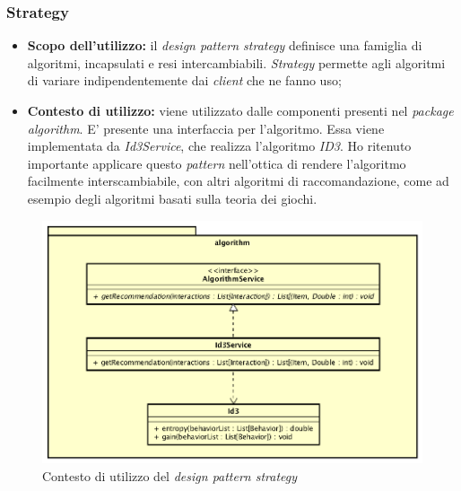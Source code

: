 \subsubsection{Strategy}
\begin{itemize}
\item\textbf{Scopo dell'utilizzo:} il \emph{design pattern strategy} definisce una famiglia di algoritmi, incapsulati e resi intercambiabili. \emph{Strategy} permette agli algoritmi di variare indipendentemente dai \emph{client} che ne fanno uso;
\item \textbf{Contesto di utilizzo:} viene utilizzato dalle componenti presenti nel \emph{package algorithm}. E' presente una interfaccia per l'algoritmo. Essa viene implementata da \emph{Id3Service}, che realizza l'algoritmo \emph{ID3}. Ho ritenuto importante applicare questo \emph{pattern} nell'ottica di rendere l'algoritmo facilmente interscambiabile, con altri algoritmi di raccomandazione, come ad esempio degli algoritmi basati sulla teoria dei giochi.
\end{itemize}
\begin{figure}[h]
\centering
\includegraphics[scale=0.30]{immagini/algorithm}
\caption{Contesto di utilizzo del \emph{design pattern strategy}}
\label{fig:pattern-strategy}
\end{figure}
\newpage
